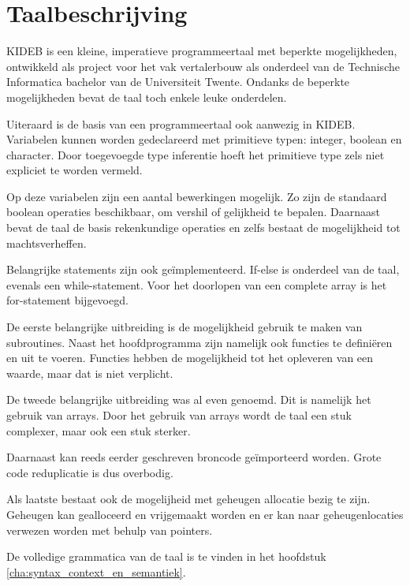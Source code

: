 \chapter{Taalbeschrijving} %
\label{cha:taalbeschrijving}
KIDEB is een kleine, imperatieve programmeertaal met beperkte mogelijkheden, ontwikkeld als project voor het vak vertalerbouw als onderdeel van de Technische Informatica bachelor van de Universiteit Twente. Ondanks de beperkte mogelijkheden bevat de taal toch enkele leuke onderdelen.

Uiteraard is de basis van een programmeertaal ook aanwezig in KIDEB. Variabelen kunnen worden gedeclareerd met primitieve typen: integer, boolean en character. Door toegevoegde type inferentie hoeft het primitieve type zels niet expliciet te worden vermeld. 

Op deze variabelen zijn een aantal bewerkingen mogelijk. Zo zijn de standaard boolean operaties beschikbaar, om vershil of gelijkheid te bepalen. Daarnaast bevat de taal de basis rekenkundige operaties en zelfs bestaat de mogelijkheid tot machtsverheffen.

Belangrijke statements zijn ook ge\"implementeerd. If-else is onderdeel van de taal, evenals een while-statement. Voor het doorlopen van een complete array is het for-statement bijgevoegd.

De eerste belangrijke uitbreiding is de mogelijkheid gebruik te maken van subroutines. Naast het hoofdprogramma zijn namelijk ook functies te defini\"eren en uit te voeren. Functies hebben de mogelijkheid tot het opleveren van een waarde, maar dat is niet verplicht.

De tweede belangrijke uitbreiding was al even genoemd. Dit is namelijk het gebruik van arrays. Door het gebruik van arrays wordt de taal een stuk complexer, maar ook een stuk sterker.

Daarnaast kan reeds eerder geschreven broncode ge\"importeerd worden. Grote code reduplicatie is dus overbodig.

Als laatste bestaat ook de mogelijheid met geheugen allocatie bezig te zijn. Geheugen kan gealloceerd en vrijgemaakt worden en er kan naar geheugenlocaties verwezen worden met behulp van pointers.

De volledige grammatica van de taal is te vinden in het hoofdstuk \ref{cha:syntax_context_en_semantiek}.

\clearpage